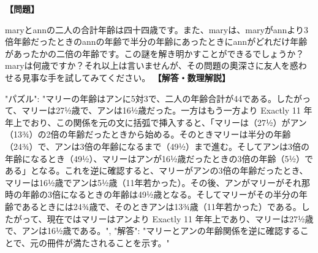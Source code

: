 \documentclass[10pt,a4paper,oneside,openany]{ltjsbook}
\begin{document}
\begin{tcolorbox}[colback=softblue,colframe=primaryblue,title=\textbf{第 51 問：HOW OLD WAS MARY?},arc=2mm,boxrule=1pt,breakable]
\textbf{【問題】}\par\vspace{0.3em}
maryとannの二人の合計年齢は四十四歳です。また、maryは、maryがannより3倍年齢だったときのannの年齢で半分の年齢にあったときにannがどれだけ年齢があったかの二倍の年齢です。この謎を解き明かすことができるでしょうか？maryは何歳ですか？それ以上は言いませんが、その問題の奧深さに友人を惑わせる見事な手を試してみてください。
\tcblower
\textbf{【解答・数理解説】}\par\vspace{0.3em}
{
"パズル": "マリーの年齢はアンに5対3で、二人の年齢合計が44である。したがって、マリーは27½歳で、アンは16½歳だった。一方はもう一方より Exactly 11 年年上でおり、この関係を元の文に括弧で挿入すると、「マリーは（27½）がアン（13¾）の2倍の年齢だったときから始める。そのときマリーは半分の年齢（24¾）で、アンは3倍の年齢になるまで（49½）まで進む。そしてアンは3倍の年齢になるとき（49½）、マリーはアンが16½歳だったときの3倍の年齢（5½）である」となる。これを逆に確認すると、マリーがアンの3倍の年齢だったとき、マリーは16½歳でアンは5½歳（11年若かった）。その後、アンがマリーがそれ那時の年齢の3倍になるときの年齢は49½歳となる。そしてマリーがその半分の年齢であるときには24¾歳で、そのときアンは13¾歳（11年若かった）である。したがって、現在ではマリーはアンより Exactly 11 年年上であり、マリーは27½歳で、アンは16½歳である。",
"解答": "マリーとアンの年齢関係を逆に確認することで、元の冊件が満たされることを示す。"
}
\end{tcolorbox}
\end{document}
